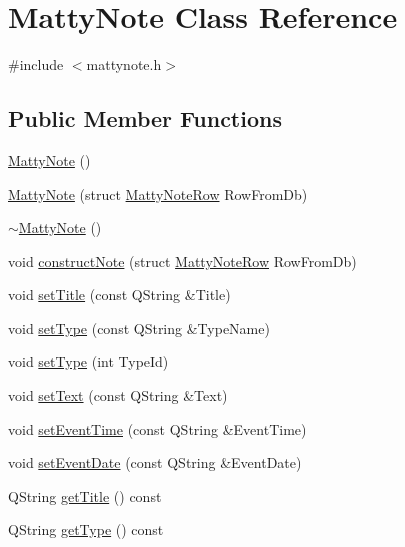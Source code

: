\hypertarget{class_matty_note}{}\section{Matty\+Note Class Reference}
\label{class_matty_note}


{\ttfamily \#include $<$mattynote.\+h$>$}

\subsection*{Public Member Functions}
\begin{DoxyCompactItemize}
\item 
\hyperlink{class_matty_note_a8c09bf366e6973bc1c4f4d5daa792899}{Matty\+Note} ()
\item 
\hyperlink{class_matty_note_afc1ae99b01e8a2be3bcbb79c970f8b92}{Matty\+Note} (struct \hyperlink{struct_matty_note_row}{Matty\+Note\+Row} Row\+From\+Db)
\item 
\hyperlink{class_matty_note_a2831641523b4a0d5c36100689f95c912}{$\sim$\+Matty\+Note} ()
\item 
void \hyperlink{class_matty_note_a16fe7f1ba5e6b4426bdc2183ec0eaa93}{construct\+Note} (struct \hyperlink{struct_matty_note_row}{Matty\+Note\+Row} Row\+From\+Db)
\item 
void \hyperlink{class_matty_note_af7909f64608b020b501019cf29796eb0}{set\+Title} (const Q\+String \&Title)
\item 
void \hyperlink{class_matty_note_ac9171fd4faaf0c286c9315a0b4ef4560}{set\+Type} (const Q\+String \&Type\+Name)
\item 
void \hyperlink{class_matty_note_a8ae86d728b9cb64fa78042a09cb5aa70}{set\+Type} (int Type\+Id)
\item 
void \hyperlink{class_matty_note_afa0c4ee32401e4a09e8d04fd0b01da0b}{set\+Text} (const Q\+String \&Text)
\item 
void \hyperlink{class_matty_note_aaeba8670420ab9ad0fb8be660845e0ba}{set\+Event\+Time} (const Q\+String \&Event\+Time)
\item 
void \hyperlink{class_matty_note_a70676b1ab215b873c9451a82cc417684}{set\+Event\+Date} (const Q\+String \&Event\+Date)
\item 
Q\+String \hyperlink{class_matty_note_ac4dfe8978f721a55e34809a42c229cae}{get\+Title} () const 
\item 
Q\+String \hyperlink{class_matty_note_a16e61ae2edfbbea88445db2e36742650}{get\+Type} () const 
\item 

\end{DoxyCompactItemize}

